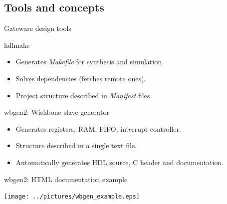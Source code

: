 \documentclass[compress,red]{beamer}
\begin{document}
\subsection{Tools and concepts}

\begin{frame}{Gateware design tools}

  \begin{block}{hdlmake}
    \begin{itemize}
    \item Generates \textit{Makefile} for synthesis and simulation.
    \item Solves dependencies (fetches remote ones).
    \item Project structure described in \textit{Manifest} files.
    \end{itemize}
  \end{block}

  \begin{block}{wbgen2: Wishbone slave generator}
    \begin{itemize}
    \item Generates registers, RAM, FIFO, interrupt controller.
    \item Structure described in a single text file.
    \item Automatically generates HDL source, C header and documentation.
    \end{itemize}
  \end{block}


\end{frame}

\begin{frame}{wbgen2: HTML documentation example}

  \begin{center}
    \texttt{[image: ../pictures/wbgen\_example.eps]}
  \end{center}


\end{frame}
\end{document}
